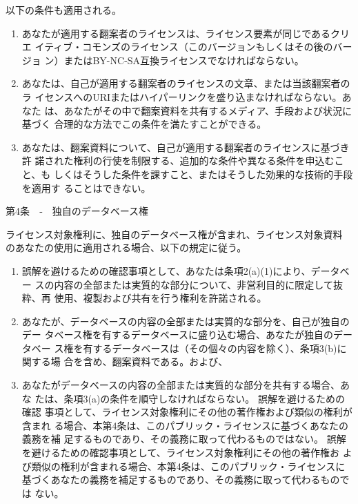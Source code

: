 {\begin{enumerate}
以下の条件も適用される。
\begin{enumerate}
\item あなたが適用する翻案者のライセンスは、ライセンス要素が同じであるクリエ
イティブ・コモンズのライセンス（このバージョンもしくはその後のバージョ
  ン）またはBY-NC-SA互換ライセンスでなければならない。
\item あなたは、自己が適用する翻案者のライセンスの文章、または当該翻案者のラ
イセンスへのURIまたはハイパーリンクを盛り込まなければならない。あなた
は、あなたがその中で翻案資料を共有するメディア、手段および状況に基づく
合理的な方法でこの条件を満たすことができる。
\item あなたは、翻案資料について、自己が適用する翻案者のライセンスに基づき許
諾された権利の行使を制限する、追加的な条件や異なる条件を申込むこと、も
しくはそうした条件を課すこと、またはそうした効果的な技術的手段を適用す
ることはできない。
\end{enumerate}
\end{enumerate}

第4条　‐　独自のデータベース権

ライセンス対象権利に、独自のデータベース権が含まれ、ライセンス対象資料
のあなたの使用に適用される場合、以下の規定に従う。

\begin{enumerate}
\renewcommand{\labelenumi}{\alph{enumi}.}
\renewcommand{\labelenumii}{\arabic{enumii}.}
\renewcommand{\labelenumiii}{\Alph{enumiii}.}

\item 誤解を避けるための確認事項として、あなたは条項2(a)(1)により、データベー
スの内容の全部または実質的な部分について、非営利目的に限定して抜粋、再
使用、複製および共有を行う権利を許諾される。
\item あなたが、データベースの内容の全部または実質的な部分を、自己が独自のデー
タベース権を有するデータベースに盛り込む場合、あなたが独自のデータベー
ス権を有するデータベースは（その個々の内容を除く）、条項3(b)に関する場
合を含め、翻案資料である。および、
\item あなたがデータベースの内容の全部または実質的な部分を共有する場合、あな
たは、条項3(a)の条件を順守しなければならない。 誤解を避けるための確認
事項として、ライセンス対象権利にその他の著作権および類似の権利が含まれ
る場合、本第4条は、このパブリック・ライセンスに基づくあなたの義務を補
足するものであり、その義務に取って代わるものではない。
誤解を避けるための確認事項として、ライセンス対象権利にその他の著作権お
よび類似の権利が含まれる場合、本第4条は、このパブリック・ライセンスに
基づくあなたの義務を補足するものであり、その義務に取って代わるものでは
ない。
\end{enumerate}

}
